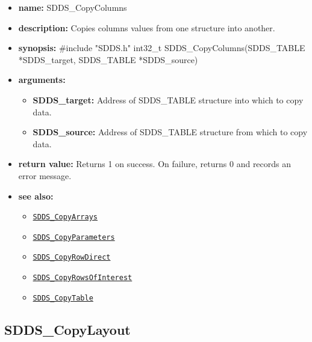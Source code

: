 \documentclass[11pt]{article}
\newcommand{\progref}[1]{\hyperref[SDDS_#1]{\tt SDDS\_#1}}
\begin{document}
\begin{itemize}
\item {\bf name:}\newline
SDDS\_CopyColumns
\item {\bf description:}\newline
Copies columns values from one structure into another.
\item {\bf synopsis:} \#include "SDDS.h"\newline
int32\_t SDDS\_CopyColumns(SDDS\_TABLE *SDDS\_target, SDDS\_TABLE *SDDS\_source)
\item {\bf arguments:}
\begin{itemize}
\item {\bf SDDS\_target:} Address of SDDS\_TABLE structure into which to copy data.
\item {\bf SDDS\_source:} Address of SDDS\_TABLE structure from which to copy data.
\end{itemize}
\item {\bf return value:}\newline
Returns 1 on success. On failure, returns 0 and records an error message.
\item {\bf see also:}
\begin{itemize}
\item \progref{CopyArrays}
\item \progref{CopyParameters}
\item \progref{CopyRowDirect}
\item \progref{CopyRowsOfInterest}
\item \progref{CopyTable}
\end{itemize}
\end{itemize}

\subsection{SDDS\_CopyLayout}
\label{SDDS_CopyLayout}
\end{document}
